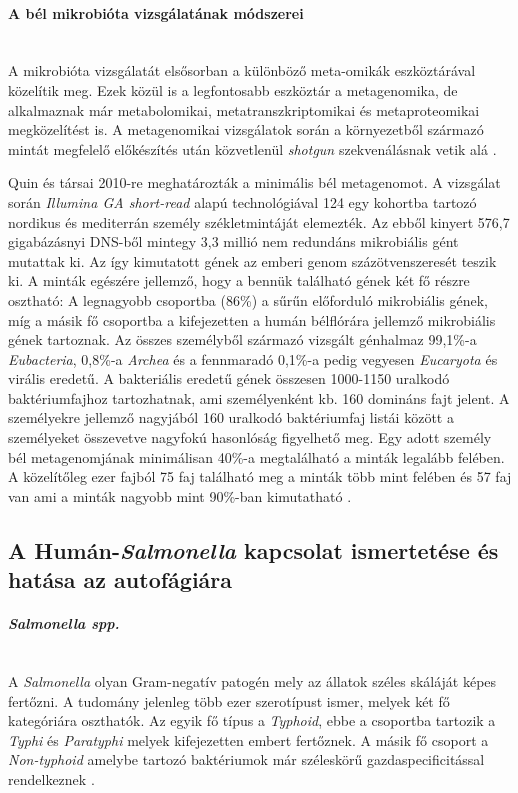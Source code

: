 \documentclass[a4paper,12pt]{article}
\begin{document}
		\paragraph{A bél mikrobióta vizsgálatának módszerei} \mbox{}\\
		A mikrobióta vizsgálatát elsősorban a különböző meta-omikák eszköztárával közelítik meg. Ezek közül is a legfontosabb eszköztár a metagenomika, de alkalmaznak már metabolomikai, metatranszkriptomikai és metaproteomikai megközelítést is. A metagenomikai vizsgálatok során a környezetből származó mintát megfelelő előkészítés után közvetlenül \textit{shotgun} szekvenálásnak vetik alá \cite{gut_microbiome}.
		
		Quin és társai 2010-re meghatározták a minimális bél metagenomot. A vizsgálat során \textit{Illumina GA short-read} alapú technológiával 124 egy kohortba tartozó nordikus és mediterrán személy székletmintáját elemezték. Az ebből kinyert 576,7 gigabázásnyi DNS-ből mintegy 3,3 millió nem redundáns mikrobiális gént mutattak ki. Az így kimutatott gének az emberi genom százötvenszeresét teszik ki. A minták egészére jellemző, hogy a bennük található gének két fő részre osztható: A legnagyobb csoportba (86\%) a sűrűn előforduló mikrobiális gének, míg a másik fő csoportba a kifejezetten a humán bélflórára jellemző mikrobiális gének tartoznak. Az összes személyből származó vizsgált génhalmaz 99,1\%-a \textit{Eubacteria}, 0,8\%-a \textit{Archea} és a fennmaradó 0,1\%-a pedig vegyesen \textit{Eucaryota} és virális eredetű. A bakteriális eredetű gének összesen 1000-1150 uralkodó baktériumfajhoz tartozhatnak, ami személyenként kb. 160 domináns fajt jelent. A személyekre jellemző nagyjából 160 uralkodó baktériumfaj listái között a személyeket összevetve nagyfokú hasonlóság figyelhető meg. Egy adott személy bél metagenomjának minimálisan 40\%-a megtalálható a minták legalább felében. A közelítőleg ezer fajból 75 faj található meg a minták több mint felében és 57 faj van ami a minták nagyobb mint 90\%-ban kimutatható  \cite{meta_omics}.
		
	
	\subsection{A Humán-\textit{Salmonella} kapcsolat ismertetése és hatása az autofágiára}
	
		\paragraph{\textit{Salmonella spp.}} \mbox{}\\
		A \textit{Salmonella} olyan Gram-negatív patogén mely az állatok széles skáláját képes fertőzni. A tudomány jelenleg több ezer szerotípust ismer, melyek két fő kategóriára oszthatók. Az egyik fő típus a \textit{Typhoid}, ebbe a csoportba tartozik a \textit{Typhi} és \textit{Paratyphi} melyek kifejezetten embert fertőznek. A másik fő csoport a \textit{Non-typhoid} amelybe tartozó baktériumok már széleskörű gazdaspecificitással rendelkeznek \cite{salmonella_and_host_cell_nature}.
		
\end{document}
